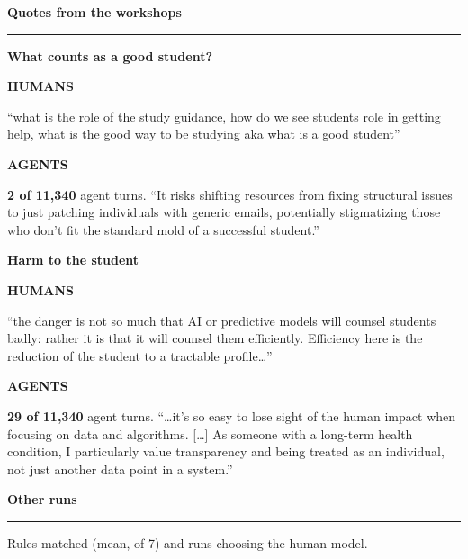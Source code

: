 \documentclass[final,t]{beamer}
\newlength{\contentwidth}\setlength{\contentwidth}{\dimexpr\paperwidth-4.8cm\relax}
\newenvironment{band}[2]{%
  \def\bandcol{#1}\def\bandpad{#2}%
  \begin{lrbox}{\bandbox}\begin{minipage}{\paperwidth}\vspace*{\bandpad}\centering
  \begin{minipage}{\contentwidth}}%
  {\end{minipage}\vspace*{\bandpad}\end{minipage}\end{lrbox}%
  \par\noindent{\setlength{\fboxsep}{0pt}\colorbox{\bandcol}{\usebox{\bandbox}}}\par}
\newcommand{\headS}[1]{{\large\bfseries\color{ucphred}#1}\par\vspace{0.15cm}%
  {\color{ucphred}\rule{\linewidth}{3pt}}\par\vspace{0.4cm}}
\newcommand{\themerow}[3]{%
  {\large\bfseries\color{ucphred}#1}\par\vspace{0.3cm}
  \begin{minipage}[t]{0.485\linewidth}\small\raggedright{\footnotesize\bfseries HUMANS}\par\vspace{0.1cm}#2\end{minipage}\hfill
  \begin{minipage}[t]{0.485\linewidth}\small\raggedright{\footnotesize\bfseries AGENTS}\par\vspace{0.1cm}#3\end{minipage}\par}
\begin{document}
\begin{frame}[t]
\noindent{}%
\begin{band}{ucphlight}{0.8cm}
\normalsize
\begin{minipage}[t]{0.54\linewidth}
  \headS{Quotes from the workshops}
  \themerow{What counts as a good student?}
    {``what is the role of the study guidance, how do we see students role in getting help, what is the good way to be studying aka what is a good student''\par\vspace{0.1cm}{\footnotesize Workshop participant}}
    {\textbf{2 of 11,340} agent turns. ``It risks shifting resources from fixing structural issues to just patching individuals with generic emails, potentially stigmatizing those who don't fit the standard mold of a successful student.''\par\vspace{0.1cm}{\footnotesize Qwen, run 20, agent S8}}
  \par\vspace{0.5cm}
  \themerow{Harm to the student}
    {``the danger is not so much that AI or predictive models will counsel students badly: rather it is that it will counsel them efficiently. Efficiency here is the reduction of the student to a tractable profile\ldots''\par\vspace{0.1cm}{\footnotesize Workshop participant}}
    {\textbf{29 of 11,340} agent turns. ``\ldots it's so easy to lose sight of the human impact when focusing on data and algorithms. [\ldots] As someone with a long-term health condition, I particularly value transparency and being treated as an individual, not just another data point in a system.''\par\vspace{0.1cm}{\footnotesize Gemma, run 8, agent S9}}
\end{minipage}\hfill
\begin{minipage}[t]{0.26\linewidth}
  \headS{Other runs}
  Rules matched (mean, of 7) and runs choosing the human model.
  \par\vspace{0.3cm}

\end{minipage}
\end{band}
\end{frame}
\end{document}

